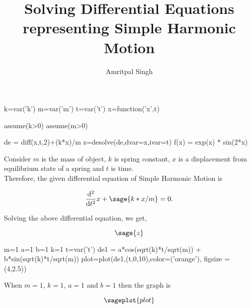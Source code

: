 \documentclass{article}
\title{Solving Differential Equations representing Simple Harmonic Motion}
\author{Amritpal Singh}
\begin{document}
\maketitle

\begin{sagesilent}
k=var('k')
m=var('m')
t=var('t')
x=function('x',t)

assume(k>0)
assume(m>0)

de = diff(x,t,2)+(k*x)/m
z=desolve(de,dvar=x,ivar=t)
f(x) = exp(x) * sin(2*x)
\end{sagesilent}
Consider $m$ is the mass of object, $k$ is spring constant, $x$ is a displacement from equilibrium state of a spring and $t$ is time. 
\\Therefore, the given differential equation of Simple Harmonic Motion is  

\begin{comment}
\begin{sagesilent}
F=var('F') 
a=var('a')
\end{sagesilent}

\[
 \sage{F==m*a} --1 \\ 
 \sage{F==-k*x} --2
\]
\end{comment}

\[
  \frac{\mathrm{d}^{2}}{\mathrm{d}t^{2}}x +  \sage{k*x/m} = 0.
\]

Solving the above differential equation, we get,

\[
\sage{z}
\]











\begin{sagesilent}
m=1
a=1
b=1
k=1
t=var('t')
de1 = a*cos(sqrt(k)*t/sqrt(m)) + b*sin(sqrt(k)*t/sqrt(m))
plot=plot(de1,(t,0,10),color=('orange'), figsize = (4,2.5))
\end{sagesilent}

When $m=1$, $k=1$, $a=1$ and $b=1$ then the graph is

$$\sageplot{plot}$$
\end{document}

